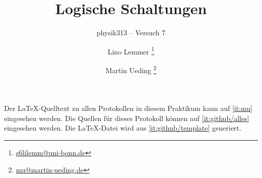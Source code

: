 


\usepackage{placeins}


\subject{Praktikumsprotokoll}
\title{Logische Schaltungen}
\subtitle{physik313 – Versuch 7}
\author{
	Lino Lemmer
    \footnote{\href{mailto:s6lilemm@uni-bonn.de}{s6lilemm@uni-bonn.de}}
	\and
	Martin Ueding
    \footnote{\href{mailto:mu@martin-ueding.de}{mu@martin-ueding.de}}
}


\newcommand\fT{f_\text{T}}
\newcommand\IB{I_\text{B}}
\newcommand\IC{I_\text{C}}
\newcommand\ID{I_\text{D}}
\newcommand\IE{I_\text{E}}
\newcommand\IS{I_\text{S}}
\newcommand\RC{R_\text{C}}
\newcommand\RD{R_\text{D}}
\newcommand\RE{R_\text{E}}
\newcommand\UBE{U_\text{BE}}
\newcommand\UB{U_\text{B}}
\newcommand\UCE{U_\text{CE}}
\newcommand\UC{U_\text{C}}
\newcommand\UD{U_\text{D}}
\newcommand\UDS{U_\text{DS}}
\newcommand\UE{U_\text{E}}
\newcommand\UGS{U_\text{GS}}
\newcommand\UG{U_\text{G}}
\newcommand\Uin{U_\text{in}}
\newcommand\Uout{U_\text{out}}

\newcommand\UEH{U_\text{E H}}
\newcommand\UEL{U_\text{E L}}
\newcommand\UH{U_\text{H}}
\newcommand\UL{U_\text{L}}
\newcommand\UQH{U_\text{Q H}}
\newcommand\UQL{U_\text{Q L}}

\newcommand\mand {\mathsc{and}}
\newcommand\mhigh{\mathsc{high}}
\newcommand\mlow {\mathsc{low}}
\newcommand\mnor {\mathsc{nor}}
\newcommand\mnot {\mathsc{not}}
\newcommand\mor  {\mathsc{or}}
\newcommand\mxor {\mathsc{xor}}
\newcommand\tand {\textsc{and}}
\newcommand\thigh{\textsc{high}}
\newcommand\tlow {\textsc{low}}
\newcommand\tmand{\mathsc{nand}}
\newcommand\tnand{\textsc{nand}}
\newcommand\tnor {\textsc{nor}}
\newcommand\tnot {\textsc{not}}
\newcommand\tor  {\textsc{or}}
\newcommand\txor {\textsc{xor}}



\maketitle

Der \LaTeX-Quelltext zu allen Protokollen in diesem Praktikum kann auf
\ref{it:mu} eingesehen werden. Die Quellen für dieses Protokoll können auf
\ref{it:github/alles} eingesehen werden. Die \LaTeX-Datei wird aus
\ref{it:github/template} generiert.

